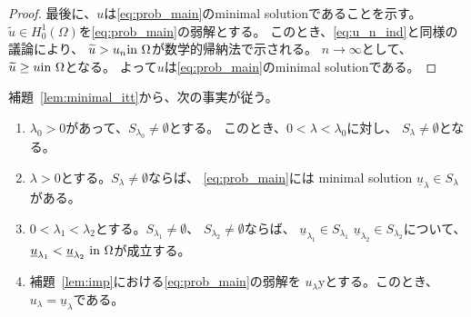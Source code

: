 \begin{proof}
 最後に、$u$は\ref{eq:prob_main}のminimal solutionであることを示す。
 $\tilde{u} \in H_0^1(\Omega)$を\ref{eq:prob_main}の弱解とする。
 このとき、\eqref{eq:u_n_ind}と同様の議論により、
 $\widetilde{u} > u_n \text{in}~ \Omega$が数学的帰納法で示される。
 $n \to \infty$として、$\widetilde{u} \geq u \text{in}~ \Omega$となる。
 よって$u$は\ref{eq:prob_main}のminimal solutionである。\qedhere
\end{proof}

補題~\ref{lem:minimal_itt}から、次の事実が従う。

\begin{lem} \label{lem:minimal_va}
 \begin{enumerate}[1.]
  \item $\lambda_0 > 0$があって、$S_{\lambda_0} \neq \emptyset$とする。
        このとき、$0 < \lambda < \lambda_0$に対し、
        $S_\lambda \neq \emptyset$となる。
  \item $\lambda > 0$とする。$S_\lambda \neq \emptyset$ならば、
        \ref{eq:prob_main}には minimal solution $\underline{u}_\lambda
        \in S_\lambda$がある。
  \item $0 < \lambda_1 < \lambda_2$とする。$S_{\lambda_1} \neq
        \emptyset$、
        $S_{\lambda_2} \neq \emptyset$ならば、
        $\underline{u}_{\lambda_1} \in S_{\lambda_1}$
        $\underline{u}_{\lambda_2} \in S_{\lambda_2}$について、
        $\underline{u}_{\lambda_1} < \underline{u}_{\lambda_2} ~\text{in}~
        \Omega$が成立する。
  \item 補題~\ref{lem:imp}における\ref{eq:prob_main}の弱解を
        $u_\lambda$yとする。このとき、$u_\lambda =
        \underline{u}_\lambda$である。
 \end{enumerate}
\end{lem}


